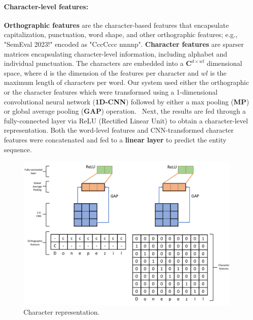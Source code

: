 \documentclass[11pt]{article}
\begin{document}
\paragraph{Character-level features: } 
%
\textbf{Orthographic features} are the character-based features that encapsulate capitalization, punctuation, word shape, and other orthographic features; e.g., "SemEval 2023!" encoded as "CccCccc nnnnp". 
\textbf{Character features} are sparser matrices encapsulating character-level information, including alphabet and individual punctuation.
The characters are embedded into a $\mathbf{C}^{d \times wl}$ dimensional space, where d is the dimension of the features per character and $wl$ is the maximum length of characters per word.
Our system used either the orthographic or the character features which were transformed using a 1-dimensional convolutional neural network (\textbf{1D-CNN}) followed by either a max pooling (\textbf{MP}) or global average pooling (\textbf{GAP}) operation.~\cite{zhou2016learning}
Next, the results are fed through a fully-connected layer via ReLU (Rectified Linear Unit) to obtain a character-level representation.
Both the word-level features and CNN-transformed character features were concatenated and fed to a \textbf{linear layer} to predict the entity sequence.
%
\begin{figure}[!htbp]
    \centering
    \includegraphics[width=\columnwidth]{figures/word_arch2.pdf}
    \caption{Character representation.}
    \label{fig:task2_char}
\end{figure}
%
%
%
\end{document}
